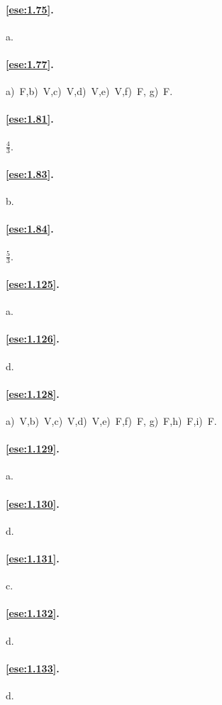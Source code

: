 \paragraph{\ref{ese:1.75}.}
a.

\paragraph{\ref{ese:1.77}.}
a)~F,\quad b)~V,\quad c)~V,\quad d)~V,\quad e)~V,\quad f)~F,\quad 
g)~F.

\paragraph{\ref{ese:1.81}.}
$\frac{4}{3}$.

\paragraph{\ref{ese:1.83}.}
b.

\paragraph{\ref{ese:1.84}.}
$\frac{5}{3}$.


\paragraph{\ref{ese:1.125}.}
a.

\paragraph{\ref{ese:1.126}.}
d.

\paragraph{\ref{ese:1.128}.}
a)~V,\quad b)~V,\quad c)~V,\quad d)~V,\quad e)~F,\quad f)~F,\quad 
g)~F,\quad h)~F,\quad i)~F.

\paragraph{\ref{ese:1.129}.}
a.

\paragraph{\ref{ese:1.130}.}
d.

\paragraph{\ref{ese:1.131}.}
c.

\paragraph{\ref{ese:1.132}.}
d.

\paragraph{\ref{ese:1.133}.}
d.

\endgroup
